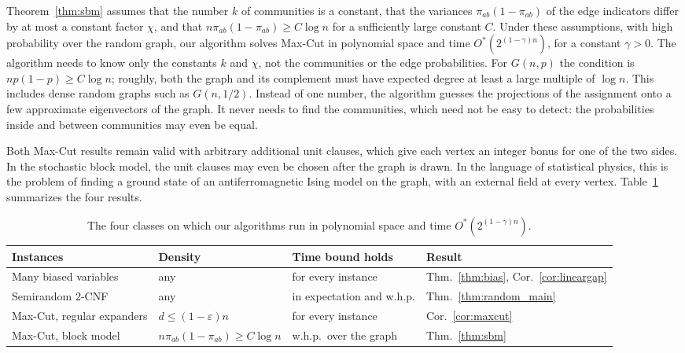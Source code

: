 \documentclass[11pt,a4paper]{article}
\theoremstyle{definition}
\theoremstyle{remark}
\newcommand{\Ostar}{O^{*}}
\begin{document}
\begin{enumerate}
Theorem~\ref{thm:sbm} assumes that the number $k$ of communities is a
constant, that the variances $\pi_{ab}(1-\pi_{ab})$ of the edge indicators
differ by at most a constant factor $\chi$, and that
$n\pi_{ab}(1-\pi_{ab})\ge C\log n$ for a sufficiently large constant $C$.
Under these assumptions, with high probability over the random graph, our
algorithm solves Max-Cut in polynomial space and time
$\Ostar(2^{(1-\gamma)n})$, for a constant $\gamma>0$. The algorithm needs
to know only the constants $k$ and $\chi$, not the communities or the edge
probabilities. For $G(n,p)$ the condition is $np(1-p)\ge C\log n$; roughly,
both the graph and its complement must have expected degree at least a
large multiple of $\log n$. This includes dense random graphs such as
$G(n,1/2)$. Instead of one number, the algorithm guesses the projections
of the assignment onto a few approximate eigenvectors of the graph. It
never needs to find the communities, which need not be easy to detect:
the probabilities inside and between communities may even be equal.
\end{enumerate}

Both Max-Cut results remain valid with arbitrary additional unit clauses,
which give each vertex an integer bonus for one of the two sides. In the
stochastic block model, the unit clauses may even be chosen after the graph
is drawn. In the language of statistical
physics, this is the problem of finding a ground state of an
antiferromagnetic Ising model on the graph, with an external field at
every vertex. Table~\ref{tab:results} summarizes the four results.

\begin{table}[ht]
\centering
\small
\setlength{\tabcolsep}{4pt}
\begin{tabular}{@{}llll@{}}
\toprule
Instances & Density & Time bound holds & Result\\
\midrule
Many biased variables & any & for every instance
  & Thm.~\ref{thm:bias}, Cor.~\ref{cor:lineargap}\\
Semirandom 2-CNF & any & in expectation and w.h.p.
  & Thm.~\ref{thm:random_main}\\
Max-Cut, regular expanders & $d\le(1-\varepsilon)n$ & for every instance
  & Cor.~\ref{cor:maxcut}\\
Max-Cut, block model & $n\pi_{ab}(1-\pi_{ab})\ge C\log n$ & w.h.p.\ over the graph
  & Thm.~\ref{thm:sbm}\\
\bottomrule
\end{tabular}
\caption{The four classes on which our algorithms run in polynomial space
and time $\Ostar(2^{(1-\gamma)n})$.}
\label{tab:results}
\end{table}
\end{document}
